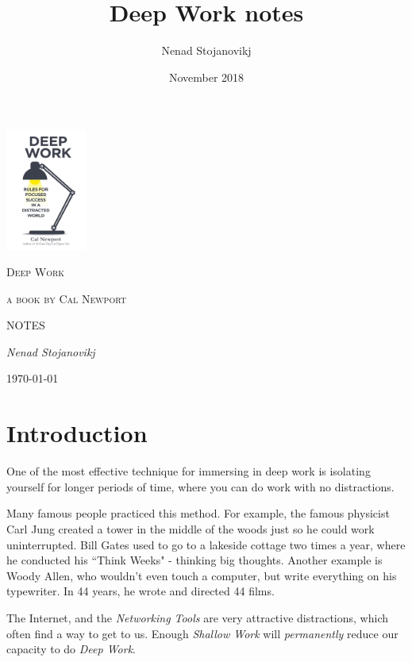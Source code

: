 \documentclass[12pt, letterpaper]{article}
\title{Deep Work notes}
\author{Nenad Stojanovikj}
\date{November 2018}
\begin{document}
\begin{titlepage}
    \centering
    \includegraphics[width=0.20\textwidth]{cover}\par\vspace{1cm}
    {\scshape\LARGE Deep Work\par}
    {\scshape\small a book by Cal Newport\par}
    {\scshape\LARGE NOTES\par}
    \vspace{1cm}
    {\Large\itshape Nenad Stojanovikj\par}
    \vfill
    {\large \today\par}
    \thispagestyle{empty}
    \setcounter{page}{0}
\end{titlepage}

\tableofcontents
\break

\section*{Introduction}

One of the most effective technique for immersing in deep work is isolating yourself for longer periods of time, where you can do work with no distractions.

Many famous people practiced this method. For example, the famous physicist Carl Jung created a tower in the middle of the woods just so he could work uninterrupted. Bill Gates used to go to a lakeside cottage two times a year, where he conducted his ``Think Weeks" - thinking big thoughts. Another example is Woody Allen, who wouldn't even touch a computer, but write everything on his typewriter. In 44 years, he wrote and directed 44 films.

\bigbreak
The Internet, and the \emph{Networking Tools} are very attractive distractions, which often find a way to get to us. Enough \emph{Shallow Work} will \emph{permanently} reduce our capacity to do \emph{Deep Work}.
\end{document}
